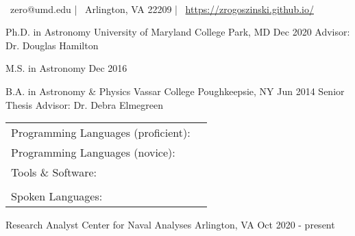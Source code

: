 \documentclass[]{awesome-cv}
\newcommand{\changeurlcolor}[1]{\hypersetup{urlcolor=#1}}
\begin{document}
    
\begin{center}
	  \\
	\vspace{2mm}
	{\faEnvelope\ zero@umd.edu} | {\faMapMarker\ Arlington, VA 22209} | {\faLink\ \changeurlcolor{black}\href{https://zrogoszinski.github.io/}{https://zrogoszinski.github.io/}}
\end{center}
\begin{cventries}
	\cventry
	{Ph.D. in Astronomy}
	{University of Maryland}
	{College Park, MD}
	{Dec 2020}
	{Advisor: Dr. Douglas Hamilton}
	
	\vspace{-2mm}
	\cventry
	{M.S. in Astronomy}
	{}
	{}
	{Dec 2016}
	{}
	
	\vspace{-5mm}
	\cventry
	{B.A. in Astronomy \& Physics}
	{Vassar College}
	{Poughkeepsie, NY}
	{Jun 2014}
	{Senior Thesis Advisor: Dr. Debra Elmegreen}
\end{cventries}

\vspace{-2mm}

\begin{cventries}
	\cventry
	{}
	{\def\arraystretch{1.15}{\begin{tabular}{ l l }
		Programming Languages (proficient):  & {\skill{ Python, C, \LaTeX, shell scripting}} \\
		Programming Languages (novice):  & {\skill{ HTML/CSS}} \\
		Tools \& Software:  & {\skill{ HDF5, Numpy, Matplotlib, Pandas, Scikit-learn, SciPy, Seaborn}} \\
		& {\skill{ Git, Jupyter Notebook, Microsoft Office, Slurm, Unix/Linux}} \\
		Spoken Languages:  & {\skill{ English (native), Hebrew (advanced)}}
		\end{tabular}}}
	{}
	{}
	{}
\end{cventries}

\vspace{-9mm}

\begin{cventries}
	\cventry
	{Research Analyst}
	{Center for Naval Analyses}
	{Arlington, VA}
	{Oct 2020 - present}
	{}
\end{cventries}
\end{document}
